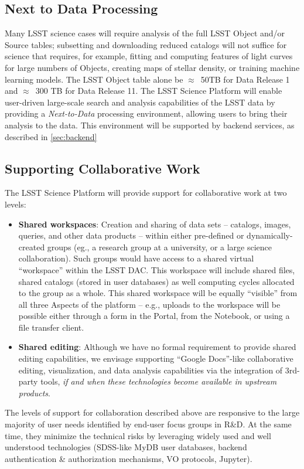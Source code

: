 \subsection{Next to Data Processing\label{sec:n2d}}
Many LSST science cases will require analysis of the full LSST Object and/or Source tables; subsetting and downloading reduced catalogs will not suffice for science that requires, for example, fitting and computing features of light curves for large numbers of Objects, creating maps of stellar density,  or training machine learning models. The LSST Object table alone be $\approx$~50TB for Data Release 1 and  $\approx$~300 TB for Data Release 11. The LSST Science Platform will enable user-driven large-scale search and analysis capabilities of the LSST data by providing a \textit{Next-to-Data} processing environment, allowing users to bring their analysis to the data. This environment will be supported by backend services, as described in \ref{sec:backend}

\subsection{Supporting Collaborative Work\label{sec:collab}}

The LSST Science Platform will provide support for collaborative work at two levels:
\begin{itemize}
	\item \textbf{Shared workspaces}: Creation and sharing of data sets -- catalogs, images, queries, and other data products -- within either pre-defined or dynamically-created groups (eg., a research group at a university, or a large science collaboration). Such groups would have access to a shared virtual ``workspace'' within the LSST DAC. This workspace will include shared files, shared catalogs (stored in user databases) as well computing cycles allocated to the group as a whole. This shared workspace will be equally ``visible'' from all three Aspects of the platform -- e.g., uploads to the workspace will be possible either through a form in the Portal, from the Notebook, or using a file transfer client.

	\item \textbf{Shared editing}: Although we have no formal requirement to provide shared editing capabilities, we envisage supporting ``Google Docs''-like collaborative editing, visualization, and data analysis capabilities via the integration of 3rd-party tools, \emph{if and when these technologies become available in upstream products}. 
\end{itemize}

The levels of support for collaboration described above are responsive to the large majority of user needs identified by end-user focus groups in R\&D. At the same time, they minimize the technical risks by leveraging widely used and well understood technologies (SDSS-like MyDB user databases, backend authentication \& authorization mechanisms, VO protocols, Jupyter).